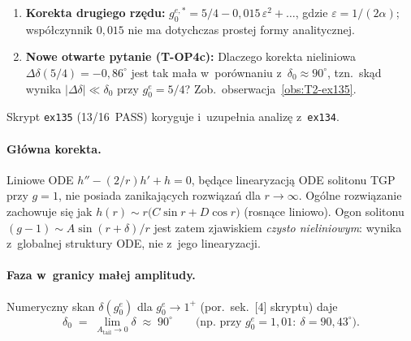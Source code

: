 \begin{observation}[Faza ogona solitonu TGP przy $g_0^e = 5/4$
  (\texttt{ex134})]
\begin{enumerate}
    \item \textbf{Korekta drugiego rz\k{e}du:}
      $g_0^{e,*} = 5/4 - 0{,}015\,\varepsilon^2 + \ldots$, gdzie
      $\varepsilon = 1/(2\alpha)$; wsp\'o\l{}czynnik $0{,}015$
      nie ma dotychczas prostej formy analitycznej.

    \item \textbf{Nowe otwarte pytanie (T-OP4c):}
      Dlaczego korekta nieliniowa $\Delta\delta(5/4) = -0{,}86^\circ$
      jest tak ma\l{}a w~por\'ownaniu z~$\delta_0 \approx 90^\circ$,
      tzn.\ sk\k{a}d wynika $|\Delta\delta| \ll \delta_0$
      przy $g_0^e = 5/4$?
      Zob.\ obserwacja~\ref{obs:T2-ex135}.
  \end{enumerate}
\end{observation}

\begin{observation}\label{obs:T2-ex135}
  Skrypt \texttt{ex135} (13/16~PASS) koryguje i~uzupe\l{}nia
  analiz\k{e} z~\texttt{ex134}.

  \paragraph{G\l{}\'owna korekta.}
  Liniowe ODE $h'' - (2/r)h' + h = 0$, b\k{e}d\k{a}ce linearyzacj\k{a}
  ODE solitonu TGP przy $g=1$, nie posiada zanikaj\k{a}cych rozwi\k{a}za\'n
  dla $r\to\infty$.  Og\'olne rozwi\k{a}zanie zachowuje si\k{e} jak
  $h(r) \sim r\bigl(C\sin r + D\cos r\bigr)$ (rosn\k{a}ce liniowo).
  Ogon solitonu $(g-1) \sim A\sin(r+\delta)/r$ jest zatem
  zjawiskiem \emph{czysto nieliniowym}: wynika z~globalnej
  struktury ODE, nie z~jego linearyzacji.

  \paragraph{Faza w~granicy ma\l{}ej amplitudy.}
  Numeryczny skan $\delta(g_0^e)$ dla $g_0^e \to 1^+$ (por.\ sek.~[4]
  skryptu) daje
  \begin{equation}\label{eq:T2-delta0-num}
    \delta_0 \;=\; \lim_{A_{\mathrm{tail}}\to0}\delta
    \;\approx\; 90^\circ
    \qquad\bigl(\text{np.\ przy }g_0^e=1{,}01{:}\ \delta=90{,}43^\circ\bigr).
  \end{equation}


\end{observation}
